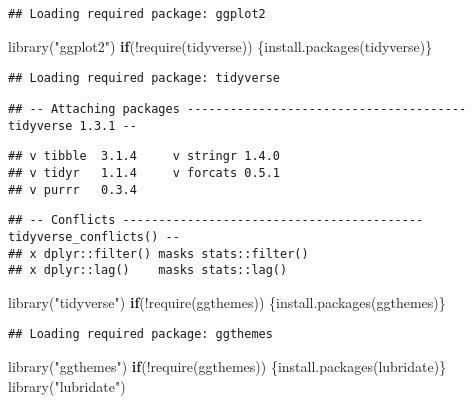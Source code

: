 \documentclass[
]{article}
\newenvironment{Shaded}{\begin{snugshade}}{\end{snugshade}}
\newcommand{\ControlFlowTok}[1]{\textcolor[rgb]{0.13,0.29,0.53}{\textbf{#1}}}
\newcommand{\FunctionTok}[1]{\textcolor[rgb]{0.00,0.00,0.00}{#1}}
\newcommand{\NormalTok}[1]{#1}
\newcommand{\SpecialCharTok}[1]{\textcolor[rgb]{0.00,0.00,0.00}{#1}}
\newcommand{\StringTok}[1]{\textcolor[rgb]{0.31,0.60,0.02}{#1}}
\begin{document}
\begin{verbatim}
## Loading required package: ggplot2
\end{verbatim}

\begin{Shaded}
\begin{Highlighting}[]
\FunctionTok{library}\NormalTok{(}\StringTok{"ggplot2"}\NormalTok{)}
\ControlFlowTok{if}\NormalTok{(}\SpecialCharTok{!}\FunctionTok{require}\NormalTok{(tidyverse)) \{}\FunctionTok{install.packages}\NormalTok{(}\StringTok{\textquotesingle{}tidyverse\textquotesingle{}}\NormalTok{)\}}
\end{Highlighting}
\end{Shaded}

\begin{verbatim}
## Loading required package: tidyverse
\end{verbatim}

\begin{verbatim}
## -- Attaching packages --------------------------------------- tidyverse 1.3.1 --
\end{verbatim}

\begin{verbatim}
## v tibble  3.1.4     v stringr 1.4.0
## v tidyr   1.1.4     v forcats 0.5.1
## v purrr   0.3.4
\end{verbatim}

\begin{verbatim}
## -- Conflicts ------------------------------------------ tidyverse_conflicts() --
## x dplyr::filter() masks stats::filter()
## x dplyr::lag()    masks stats::lag()
\end{verbatim}

\begin{Shaded}
\begin{Highlighting}[]
\FunctionTok{library}\NormalTok{(}\StringTok{"tidyverse"}\NormalTok{)}
\ControlFlowTok{if}\NormalTok{(}\SpecialCharTok{!}\FunctionTok{require}\NormalTok{(ggthemes)) \{}\FunctionTok{install.packages}\NormalTok{(}\StringTok{\textquotesingle{}ggthemes\textquotesingle{}}\NormalTok{)\}}
\end{Highlighting}
\end{Shaded}

\begin{verbatim}
## Loading required package: ggthemes
\end{verbatim}

\begin{Shaded}
\begin{Highlighting}[]
\FunctionTok{library}\NormalTok{(}\StringTok{"ggthemes"}\NormalTok{)}
\ControlFlowTok{if}\NormalTok{(}\SpecialCharTok{!}\FunctionTok{require}\NormalTok{(ggthemes)) \{}\FunctionTok{install.packages}\NormalTok{(}\StringTok{\textquotesingle{}lubridate\textquotesingle{}}\NormalTok{)\}}
\FunctionTok{library}\NormalTok{(}\StringTok{"lubridate"}\NormalTok{)}
\end{Highlighting}
\end{Shaded}
\end{document}
